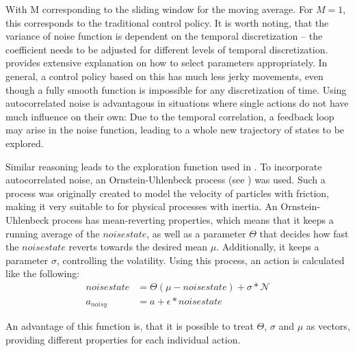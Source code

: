 With M corresponding to the sliding window for the moving average. For $M=1$, this corresponds to the traditional control policy. It is worth noting, that the variance of noise function is dependent on the temporal discretization -- the coefficient needs to be adjusted for different levels of temporal discretization. \citet{wawrzynski_control_2015} provides extensive explanation on how to select parameters appropriately. In general, a control policy based on this has much less jerky movements, even though a fully smooth function is impossible for any discretization of time. Using autocorrelated noise is advantagous in situations where single actions do not have much influence on their own: Due to the temporal correlation, a feedback loop may arise in the noise function, leading to a whole new trajectory of states to be explored.

Similar reasoning leads to the exploration function used in \cite{lillicrap_continuous_2015}. To incorporate autocorrelated noise, an Ornstein-Uhlenbeck process (see \cite{uhlenbeck_theory_1930}) was used. Such a process was originally created to model the velocity of particles with friction, making it very suitable to for physical processes with inertia. An Ornstein-Uhlenbeck process has mean-reverting properties, which means that it keeps a running average of the $noisestate$, as well as a parameter $\Theta$ that decides how fast the $noisestate$ reverts towards the desired mean $\mu$. Additionally, it keeps a parameter $\sigma$, controlling the volatility. Using this process, an action is calculated like the following:
\begin{align*}
	noisestate &= \Theta (\mu - noisestate) + \sigma * \mathcal{N}\\
	a_{noisy}  &= a + \epsilon * noisestate
\end{align*}

\noindent An advantage of this function is, that it is possible to treat $\Theta$, $\sigma$ and $\mu$ as vectors, providing different properties for each individual action.
 
 

